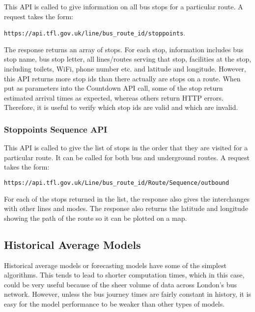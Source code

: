 This API is called to give information on all bus stops for a particular route. A request takes the form:

\begin{center}
\texttt{https://api.tfl.gov.uk/line/bus\_route\_id/stoppoints}.
\end{center}

The response returns an array of stops. For each stop, information includes bus stop name, bus stop letter, all lines/routes serving that stop, facilities at the stop, including toilets, WiFi, phone number etc. and latitude and longitude. However, this API returns more stop ids than there actually are stops on a route. When put as parameters into the Countdown API call, some of the stop return estimated arrival times as expected, whereas others return HTTP errors. Therefore, it is useful to verify which stop ids are valid and which are invalid. 

\subsubsection{Stoppoints Sequence API}

This API is called to give the list of stops in the order that they are visited for a particular route. It can be called for both bus and underground routes. A request takes the form: 

\begin{center}
    \texttt{https://api.tfl.gov.uk/Line/bus\_route\_id/Route/Sequence/outbound}
\end{center}

For each of the stops returned in the list, the response also gives the interchanges with other lines and modes. The response also returns the latitude and longitude showing the path of the route so it can be plotted on a map.

\subsection{Historical Average Models}
\label{section:historical-avg-models-research}

Historical average models or forecasting models have some of the simplest algorithms. This tends to lead to shorter computation times, which in this case, could be very useful because of the sheer volume of data across London's bus network. However, unless the bus journey times are fairly constant in history, it is easy for the model performance to be weaker than other types of models. 

